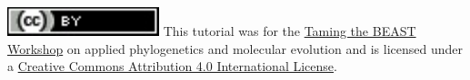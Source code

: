 \documentclass{article}
\begin{document}
\bigskip
\noindent \href{http://creativecommons.org/licenses/by/4.0/}{\includegraphics[scale=0.8]{figures/ccby.pdf}} This tutorial was for the \href{https://www.bsse.ethz.ch/cevo/taming-the-beast.html}{Taming the BEAST Workshop} on applied phylogenetics and molecular evolution and is licensed under a \href{http://creativecommons.org/licenses/by/4.0/}{Creative Commons Attribution 4.0 International License}. 



\end{document}
